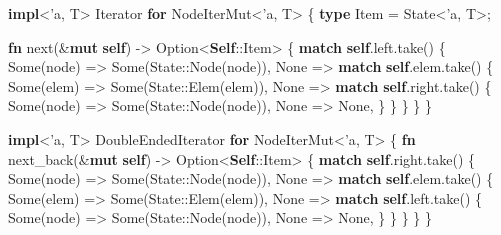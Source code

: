 \documentclass[a4paper,]{book}
\newenvironment{Shaded}{\begin{snugshade}}{\end{snugshade}}
\newcommand{\KeywordTok}[1]{\textcolor[rgb]{0.13,0.29,0.53}{\textbf{{#1}}}}
\newcommand{\DataTypeTok}[1]{\textcolor[rgb]{0.13,0.29,0.53}{{#1}}}
\newcommand{\ConstantTok}[1]{\textcolor[rgb]{0.00,0.00,0.00}{{#1}}}
\newcommand{\OtherTok}[1]{\textcolor[rgb]{0.56,0.35,0.01}{{#1}}}
\newcommand{\BuiltInTok}[1]{{#1}}
\newcommand{\NormalTok}[1]{{#1}}
\begin{document}
\begin{Shaded}
\begin{Highlighting}[]
\KeywordTok{impl}\NormalTok{<}\OtherTok{'a}\NormalTok{, T> }\BuiltInTok{Iterator} \KeywordTok{for} \NormalTok{NodeIterMut<}\OtherTok{'a}\NormalTok{, T> \{}
    \KeywordTok{type} \NormalTok{Item = State<}\OtherTok{'a}\NormalTok{, T>;}

    \KeywordTok{fn} \NormalTok{next(&}\KeywordTok{mut} \KeywordTok{self}\NormalTok{) -> }\DataTypeTok{Option}\NormalTok{<}\KeywordTok{Self}\NormalTok{::Item> \{}
        \KeywordTok{match} \KeywordTok{self}\NormalTok{.left.take() \{}
            \ConstantTok{Some}\NormalTok{(node) => }\ConstantTok{Some}\NormalTok{(State::Node(node)),}
            \ConstantTok{None} \NormalTok{=> }\KeywordTok{match} \KeywordTok{self}\NormalTok{.elem.take() \{}
                \ConstantTok{Some}\NormalTok{(elem) => }\ConstantTok{Some}\NormalTok{(State::Elem(elem)),}
                \ConstantTok{None} \NormalTok{=> }\KeywordTok{match} \KeywordTok{self}\NormalTok{.right.take() \{}
                    \ConstantTok{Some}\NormalTok{(node) => }\ConstantTok{Some}\NormalTok{(State::Node(node)),}
                    \ConstantTok{None} \NormalTok{=> }\ConstantTok{None}\NormalTok{,}
                \NormalTok{\}}
            \NormalTok{\}}
        \NormalTok{\}}
    \NormalTok{\}}
\NormalTok{\}}

\KeywordTok{impl}\NormalTok{<}\OtherTok{'a}\NormalTok{, T> }\BuiltInTok{DoubleEndedIterator} \KeywordTok{for} \NormalTok{NodeIterMut<}\OtherTok{'a}\NormalTok{, T> \{}
    \KeywordTok{fn} \NormalTok{next_back(&}\KeywordTok{mut} \KeywordTok{self}\NormalTok{) -> }\DataTypeTok{Option}\NormalTok{<}\KeywordTok{Self}\NormalTok{::Item> \{}
        \KeywordTok{match} \KeywordTok{self}\NormalTok{.right.take() \{}
            \ConstantTok{Some}\NormalTok{(node) => }\ConstantTok{Some}\NormalTok{(State::Node(node)),}
            \ConstantTok{None} \NormalTok{=> }\KeywordTok{match} \KeywordTok{self}\NormalTok{.elem.take() \{}
                \ConstantTok{Some}\NormalTok{(elem) => }\ConstantTok{Some}\NormalTok{(State::Elem(elem)),}
                \ConstantTok{None} \NormalTok{=> }\KeywordTok{match} \KeywordTok{self}\NormalTok{.left.take() \{}
                    \ConstantTok{Some}\NormalTok{(node) => }\ConstantTok{Some}\NormalTok{(State::Node(node)),}
                    \ConstantTok{None} \NormalTok{=> }\ConstantTok{None}\NormalTok{,}
                \NormalTok{\}}
            \NormalTok{\}}
        \NormalTok{\}}
    \NormalTok{\}}
\NormalTok{\}}


\end{Highlighting}
\end{Shaded}
\end{document}
